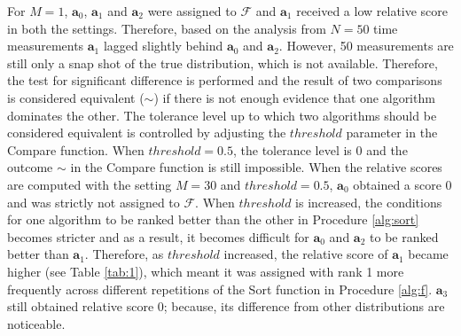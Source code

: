 \documentclass[conference]{IEEEtran}
\newcommand{\p}[1]{{\color{blue} Pdj: #1}}
\begin{document}
For $M=1$, $\mathbf{a}_0$, $\mathbf{a}_1$ and $\mathbf{a}_2$ were assigned to  $\mathcal{F}$ and $\mathbf{a}_1$ received a low relative score in both the settings. Therefore, based on the analysis from $N=50$ time measurements $\mathbf{a}_1$ lagged slightly behind $\mathbf{a}_0$ and $\mathbf{a}_2$. However, 50 measurements are still only a snap shot of the true distribution, which is not available. Therefore, the test for significant
difference is performed and the result of two comparisons is considered equivalent ($\sim$) if there is not enough evidence
that one algorithm dominates the other. The tolerance level up to which two algorithms should be considered equivalent
is controlled by adjusting the $threshold$ parameter in the Compare function. When $threshold=0.5$, the tolerance level is 0 and the outcome $\sim$ in the Compare function is still impossible. When the relative scores are computed with the setting  $M=30$ and $threshold=0.5$, $\mathbf{a}_0$ obtained a score 0 and was strictly not assigned to $\mathcal{F}$.  When $threshold$ is increased, the conditions for one algorithm to be ranked better than the other in Procedure \ref{alg:sort} becomes stricter and as a result, it becomes difficult for $\mathbf{a}_0$ and $\mathbf{a}_2$ to be ranked better than $\mathbf{a}_1$. Therefore, as $threshold$ increased, the relative score of $\mathbf{a}_1$ became higher (see Table \ref{tab:1}), which meant it was assigned with rank 1 more frequently across different repetitions of the  Sort function in Procedure \ref{alg:f}. $\mathbf{a}_3$ still obtained relative score 0; because, its difference from other distributions are noticeable.

\end{document}
